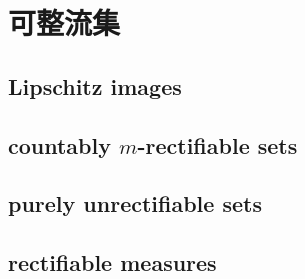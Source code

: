 \section{可整流集}
\label{b1:sec:1901}


\subsection{Lipschitz images}
\label{b1:subsec:190101}

\subsection{countably \texorpdfstring{\(m\)}{m}-rectifiable sets}
\label{b1:subsec:190102}

\subsection{purely unrectifiable sets}
\label{b1:subsec:190103}

\subsection{rectifiable measures}
\label{b1:subsec:190104}


